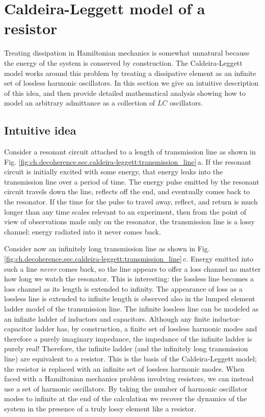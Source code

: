 \section{Caldeira-Leggett model of a resistor} \label{sec:ch.decoherence:caldeira-leggett}


Treating dissipation in Hamiltonian mechanics is somewhat unnatural because the energy of the system is conserved by construction.
The Caldeira-Leggett model works around this problem by treating a dissipative element as an infinite set of lossless harmonic oscillators.
In this section we give an intuitive description of this idea, and then provide detailed mathematical analysis showing how to model an arbitrary admittance as a collection of $LC$ oscillators.

\subsection{Intuitive idea}

Consider a resonant circuit attached to a length of transmission line as shown in Fig. \ref{fig:ch.decoherence.sec.caldeira-leggett:transmission_line}\,a.
If the resonant circuit is initially excited with some energy, that energy leaks into the transmission line over a period of time.
The energy pulse emitted by the resonant circuit travels down the line, reflects off the end, and eventually comes back to the resonator.
If the time for the pulse to travel away, reflect, and return is much longer than any time scales relevant to an experiment, then from the point of view of observations made only on the resonator, the transmission line is a lossy channel: energy radiated into it never comes back.

Consider now an infinitely long transmission line as shown in Fig. \ref{fig:ch.decoherence.sec.caldeira-leggett:transmission_line}\,c.
Energy emitted into such a line \emph{never} comes back, so the line appears to offer a loss channel no matter how long we watch the resonator.
This is interesting: the lossless line becomes a loss channel as its length is extended to infinity.
The appearance of loss as a lossless line is extended to infinite length is observed also in the lumped element ladder model of the transmission line.
The infinite lossless line can be modeled as an infinite ladder of inductors and capacitors.
Although any finite inductor-capacitor ladder has, by construction, a finite set of lossless harmonic modes and therefore a purely imaginary impedance, the impedance of the infinite ladder is purely real!
Therefore, the infinite ladder (and the infinitely long transmission line) are equivalent to a resistor.
This is the basis of the Caldeira-Leggett model; the resistor is replaced with an infinite set of lossless harmonic modes.
When faced with a Hamiltonian mechanics problem involving resistors, we can instead use a set of harmonic oscillators.
By taking the number of harmonic oscillator modes to infinite at the end of the calculation we recover the dynamics of the system in the presence of a truly lossy element like a resistor.

